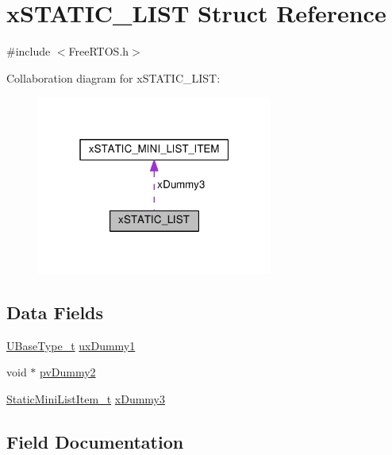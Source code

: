 \hypertarget{structxSTATIC__LIST}{}\section{x\+S\+T\+A\+T\+I\+C\+\_\+\+L\+I\+ST Struct Reference}
\label{structxSTATIC__LIST}


{\ttfamily \#include $<$Free\+R\+T\+O\+S.\+h$>$}



Collaboration diagram for x\+S\+T\+A\+T\+I\+C\+\_\+\+L\+I\+ST\+:\nopagebreak
\begin{figure}[H]
\begin{center}
\leavevmode
\includegraphics[width=220pt]{d6/dc5/structxSTATIC__LIST__coll__graph}
\end{center}
\end{figure}
\subsection*{Data Fields}
\begin{DoxyCompactItemize}
\item 
\hyperlink{portmacro_8h_a646f89d4298e4f5afd522202b11cb2e6}{U\+Base\+Type\+\_\+t} \hyperlink{structxSTATIC__LIST_a6d7f720dc21e3a676b885b72a945fea7}{ux\+Dummy1}
\item 
void $\ast$ \hyperlink{structxSTATIC__LIST_a681e588716be5f49fe8e9eb73e8f280e}{pv\+Dummy2}
\item 
\hyperlink{FreeRTOS_8h_a9097f48f4dfa56e8e01d9179462c7994}{Static\+Mini\+List\+Item\+\_\+t} \hyperlink{structxSTATIC__LIST_a232545ebb5629617e0ee6ba286e37788}{x\+Dummy3}
\end{DoxyCompactItemize}


\subsection{Field Documentation}
